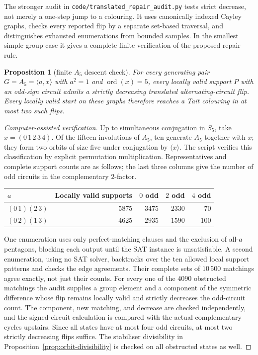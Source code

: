 \documentclass[11pt,a4paper]{article}
\newtheorem{proposition}[theorem]{Proposition}
\theoremstyle{definition}
\theoremstyle{remark}
\newcommand{\ord}{\operatorname{ord}}
\begin{document}
The stronger audit in \nolinkurl{code/translated_repair_audit.py} tests strict decrease, not merely a one-step jump to a colouring.  It uses canonically indexed Cayley graphs, checks every reported flip by a separate set-based traversal, and distinguishes exhausted enumerations from bounded samples.  In the smallest simple-group case it gives a complete finite verification of the proposed repair rule.

\begin{proposition}[finite $A_5$ descent check]\label{prop:a5-descent-check}
For every generating pair $G=A_5=\langle a,x\rangle$ with $a^2=1$ and $\ord(x)=5$, every locally valid support $P$ with an odd-sign circuit admits a strictly decreasing translated alternating-circuit flip.  Every locally valid start on these graphs therefore reaches a Tait colouring in at most two such flips.
\end{proposition}
\begin{proof}[Computer-assisted verification]
Up to simultaneous conjugation in $S_5$, take $x=(0\,1\,2\,3\,4)$.  Of the fifteen involutions of $A_5$, ten generate $A_5$ together with $x$; they form two orbits of size five under conjugation by $\langle x\rangle$.  The script verifies this classification by explicit permutation multiplication.  Representatives and complete support counts are as follows; the last three columns give the number of odd circuits in the complementary $2$-factor.
\begin{center}
\begin{tabular}{@{}lrrrr@{}}
\toprule
$a$ & Locally valid supports & $0$ odd & $2$ odd & $4$ odd\\
\midrule
$(0\,1)(2\,3)$ & $5875$ & $3475$ & $2330$ & $70$\\
$(0\,2)(1\,3)$ & $4625$ & $2935$ & $1590$ & $100$\\
\bottomrule
\end{tabular}
\end{center}
One enumeration uses only perfect-matching clauses and the exclusion of all-$a$ pentagons, blocking each output until the SAT instance is unsatisfiable.  A second enumeration, using no SAT solver, backtracks over the ten allowed local support patterns and checks the edge agreements.  Their complete sets of $10\,500$ matchings agree exactly, not just their counts.  For every one of the $4090$ obstructed matchings the audit supplies a group element and a component of the symmetric difference whose flip remains locally valid and strictly decreases the odd-circuit count.  The component, new matching, and decrease are checked independently, and the signed-circuit calculation is compared with the actual complementary cycles upstairs.  Since all states have at most four odd circuits, at most two strictly decreasing flips suffice.  The stabiliser divisibility in Proposition~\ref{prop:orbit-divisibility} is checked on all obstructed states as well.
\end{proof}
\end{document}
